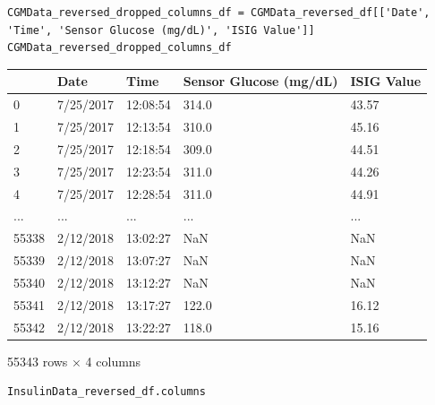 \begin{verbatim}
CGMData_reversed_dropped_columns_df = CGMData_reversed_df[['Date', 'Time', 'Sensor Glucose (mg/dL)', 'ISIG Value']]
CGMData_reversed_dropped_columns_df
\end{verbatim}

\bigskip\noindent
\begin{tabular}{p{}p{}p{}p{}p{}}
\toprule
 & Date & Time & Sensor Glucose (mg/dL) & ISIG Value \\
\hline
0 & 7/25/2017 & 12:08:54 & 314.0 & 43.57 \\
\hline
1 & 7/25/2017 & 12:13:54 & 310.0 & 45.16 \\
\hline
2 & 7/25/2017 & 12:18:54 & 309.0 & 44.51 \\
\hline
3 & 7/25/2017 & 12:23:54 & 311.0 & 44.26 \\
\hline
4 & 7/25/2017 & 12:28:54 & 311.0 & 44.91 \\
\hline
... & ... & ... & ... & ... \\
\hline
55338 & 2/12/2018 & 13:02:27 & NaN & NaN \\
\hline
55339 & 2/12/2018 & 13:07:27 & NaN & NaN \\
\hline
55340 & 2/12/2018 & 13:12:27 & NaN & NaN \\
\hline
55341 & 2/12/2018 & 13:17:27 & 122.0 & 16.12 \\
\hline
55342 & 2/12/2018 & 13:22:27 & 118.0 & 15.16 \\
\hline
\bottomrule
\end{tabular}

\bigskip

55343 rows $\times$ 4 columns

\begin{verbatim}
InsulinData_reversed_df.columns
\end{verbatim}

